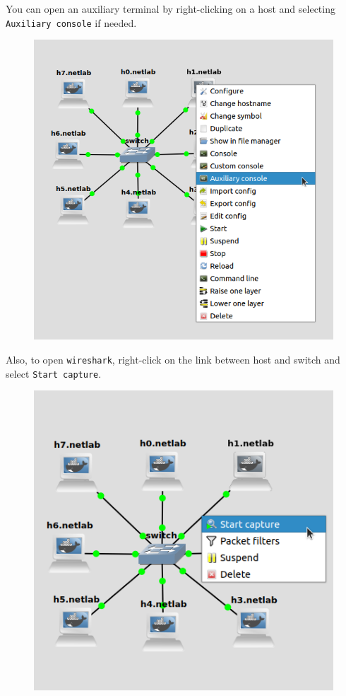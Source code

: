 \documentclass{../UTNetLab}
\begin{document}
    You can open an auxiliary terminal by right-clicking on a host and selecting \texttt{Auxiliary console} if needed.
    \begin{figure}[H]
        \centering
        \includegraphics[scale=1.6]{img/auxiliary}
    \end{figure}

    Also, to open \lstinline{wireshark}, right-click on the link between host and switch and select \texttt{Start capture}.
    \begin{figure}[H]
        \centering
        \includegraphics[scale=1.6]{img/capture}
    \end{figure}
\end{document}
